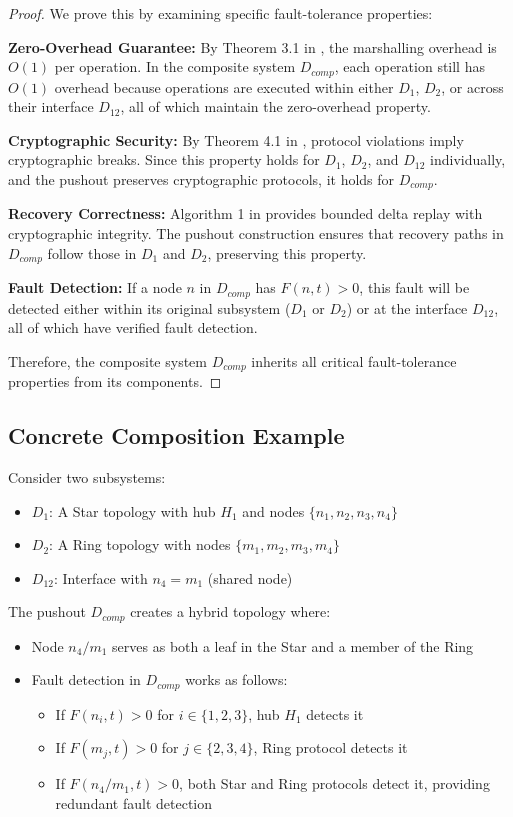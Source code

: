 \documentclass{article}
\begin{document}
\begin{proof}
We prove this by examining specific fault-tolerance properties:

\textbf{Zero-Overhead Guarantee:} By Theorem 3.1 in \cite{obinexus2025marshalling}, the marshalling overhead is $O(1)$ per operation. In the composite system $D_{comp}$, each operation still has $O(1)$ overhead because operations are executed within either $D_1$, $D_2$, or across their interface $D_{12}$, all of which maintain the zero-overhead property.

\textbf{Cryptographic Security:} By Theorem 4.1 in \cite{obinexus2025marshalling}, protocol violations imply cryptographic breaks. Since this property holds for $D_1$, $D_2$, and $D_{12}$ individually, and the pushout preserves cryptographic protocols, it holds for $D_{comp}$.

\textbf{Recovery Correctness:} Algorithm 1 in \cite{obinexus2025marshalling} provides bounded delta replay with cryptographic integrity. The pushout construction ensures that recovery paths in $D_{comp}$ follow those in $D_1$ and $D_2$, preserving this property.

\textbf{Fault Detection:} If a node $n$ in $D_{comp}$ has $F(n, t) > 0$, this fault will be detected either within its original subsystem ($D_1$ or $D_2$) or at the interface $D_{12}$, all of which have verified fault detection.

Therefore, the composite system $D_{comp}$ inherits all critical fault-tolerance properties from its components.
\end{proof}

\subsection{Concrete Composition Example}

Consider two subsystems:
\begin{itemize}
\item $D_1$: A Star topology with hub $H_1$ and nodes $\{n_1, n_2, n_3, n_4\}$
\item $D_2$: A Ring topology with nodes $\{m_1, m_2, m_3, m_4\}$
\item $D_{12}$: Interface with $n_4 = m_1$ (shared node)
\end{itemize}

The pushout $D_{comp}$ creates a hybrid topology where:
\begin{itemize}
\item Node $n_4/m_1$ serves as both a leaf in the Star and a member of the Ring
\item Fault detection in $D_{comp}$ works as follows:
\begin{itemize}
\item If $F(n_i, t) > 0$ for $i \in \{1,2,3\}$, hub $H_1$ detects it
\item If $F(m_j, t) > 0$ for $j \in \{2,3,4\}$, Ring protocol detects it
\item If $F(n_4/m_1, t) > 0$, both Star and Ring protocols detect it, providing redundant fault detection
\end{itemize}
\end{itemize}
\end{document}
